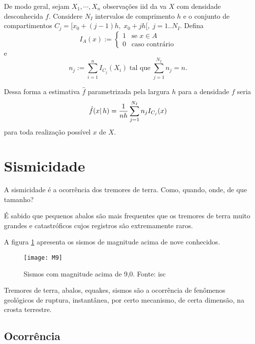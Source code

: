 De modo geral, sejam $X_1, \cdots, X_n$ observações \gls{iid} da \gls{va} $X$ com densidade desconhecida $f$. 
Considere $N_I$ intervalos de comprimento $h$ e o conjunto de compartimentos $C_j = [x_0 + (j -1)h,\; x_0 + jh[,\;
j=1..N_I$.
Defina
\[
	I_A(x) := \begin{cases}
		1 & \text{se } x \in A \\
		0 & \text{caso contrário}
	\end{cases}
\] 
e 
\[	n_j := \sum_{i=1}^{n}I_{C_j}(X_i)\; \text{tal que} \;  \sum_{j=1}^{N_I}n_j = n. \]

Dessa forma a estimativa $\hat{f}$ parametrizada pela largura $h$ para a densidade $f$ seria
\begin{equation}
	\hat{f}(x \arrowvert\, h) = \frac{1}{nh} \sum_{j=1}^{N_I}n_jI_{C_j}(x)
	\label{eq:hist_04}
\end{equation}
para toda realização possível $x$ de $X$.






\section{Sismicidade}
\label{sec:sismicidade}

A sismicidade é a ocorrência dos tremores de terra. Como, quando, onde, de que tamanho?

É sabido que pequenos abalos são mais frequentes que os tremores de terra
muito grandes e catastróficos cujos registros são extremamente raros.

A figura \ref{f:m9} apresenta os sismos de magnitude acima de nove conhecidos.

\begin{figure}[H]
   \centering
   \texttt{[image: M9]}
   \caption[Sismos com magnitude acima de 9,0.]
   		   {Sismos com magnitude acima de 9,0. Fonte: \gls{isc}} 
   \label{f:m9}
\end{figure} 


Tremores de terra, abalos, \glspl{equake}, sismos são a ocorrência de
fenômenos geológicos de ruptura, instantânea, por certo mecanismo, de certa dimensão, na
crosta terrestre.

\subsection{Ocorrência}
\label{sec:ocorrencia}
 
